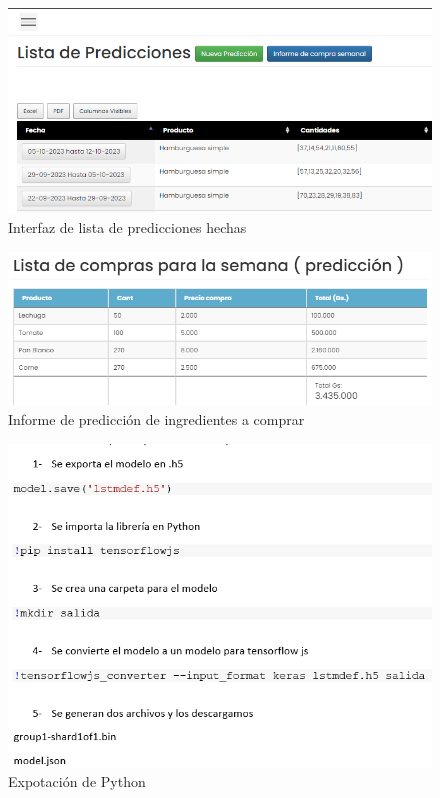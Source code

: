   \begin{figure}[H]
    \begin{center}
      \includegraphics[scale=0.65]{./sistema/lista_predicciones.png}
      \caption{Interfaz de lista de predicciones hechas}
      \label{fig:product}
    \end{center}
  \end{figure}

  \begin{figure}[H]
    \begin{center}
      \includegraphics[scale=0.65]{./sistema/Informe de compra prediccion.png}
      \caption{Informe de predicción de ingredientes a comprar }
      \label{fig:product}
    \end{center}
  \end{figure}


  \begin{figure}[H]
    \begin{center}
      \includegraphics[scale=0.90]{./sistema/primeraparte.png}
      \caption{Expotación de Python}
      \label{fig:python}
    \end{center}
  \end{figure}

